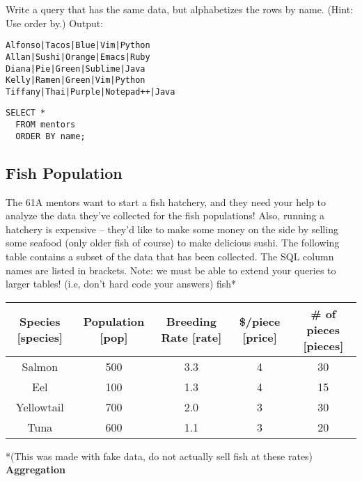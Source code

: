 \documentclass{exam}
\begin{document}
\begin{questions}
\begin{blocksection}
\question Write a query that has the same data, but alphabetizes the rows by name. (Hint: Use order by.) \newline
Output:
\begin{lstlisting}
Alfonso|Tacos|Blue|Vim|Python
Allan|Sushi|Orange|Emacs|Ruby
Diana|Pie|Green|Sublime|Java
Kelly|Ramen|Green|Vim|Python
Tiffany|Thai|Purple|Notepad++|Java
\end{lstlisting}
\begin{solution}[1in]
\begin{lstlisting}
SELECT * 
  FROM mentors
  ORDER BY name;
\end{lstlisting}
\end{solution}
\end{blocksection}


\begin{blocksection}
\section{Fish Population} 
The 61A mentors want to start a fish hatchery, and they need your help to analyze the data they've collected for the fish populations! Also, running a hatchery is expensive -- they'd like to make some money on the side by selling some seafood (only older fish of course) to make delicious sushi. \newline
\newline
The following table contains a subset of the data that has been collected. The SQL column names are listed in brackets. Note: we must be able to extend your queries to larger tables! (i.e, don't hard code your answers) \newline
\newline
fish*
\begin{center}
\begin{tabular}{ |c|c|c|c|c| } 
 \hline
 Species [species] & Population [pop] & Breeding Rate [rate] & \$/piece [price] & \# of pieces [pieces] \\ 
 \hline
 Salmon & 500 & 3.3 & 4 & 30 \\ 
 \hline
 Eel & 100 & 1.3 & 4 & 15 \\ 
 \hline
  Yellowtail & 700 & 2.0 & 3 & 30 \\ 
 \hline
 Tuna & 600 & 1.1 & 3 & 20 \\ 
 \hline
\end{tabular}
\end{center}
*(This was made with fake data, do not actually sell fish at these rates)
\question \textbf{Aggregation} 
\begin{parts}

\end{parts}
\end{blocksection}
\end{questions}
\end{document}
